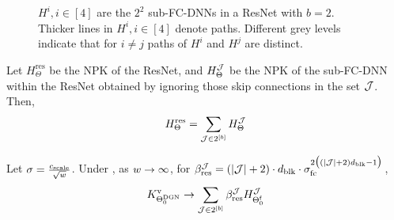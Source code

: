 \begin{figure}[h]
\caption{\small{$H^i,i\in[4]$ are the $2^2$ sub-FC-DNNs in a ResNet with $b=2$. Thicker lines in $H^i,i\in[4]$ denote paths. Different grey levels indicate that for $i\neq j$ paths of $H^i$ and $H^j$ are distinct.}}
\label{fig:subfcdnn}
\end{figure}

\begin{lemma}\label{lm:sumofproduct}
Let $H^{\text{res}}_{\Theta}$ be the NPK of the ResNet, and $H^{\mathcal{J}}_{\Theta}$ be the NPK of the sub-FC-DNN within the ResNet obtained by ignoring those skip connections in the set $\mathcal{J}$. Then, \begin{align*}H^{\text{res}}_{\Theta}=\sum_{\mathcal{J}\in 2^{[b]}}H^{\mathcal{J}}_{\Theta}\end{align*}
\end{lemma}

\begin{theorem}\label{th:mainres} Let $\sigma=\frac{c_{\text{scale}}}{\sqrt{w}}$. Under , as $w\rightarrow\infty$,  for $\beta_{\text{res}}^{\mathcal{J}} = (|\mathcal{J}| +2)\cdot d_{\text{blk}}\cdot \sigma_{\text{fc}}^{2\big( (|\mathcal{J}|+2)d_{\text{blk}}-1\big)}$,
\begin{align*}
K^{\text{v}}_{\Theta^{\text{DGN}}_0}\rightarrow \sum_{\mathcal{J}\in 2^{[b]}}  \beta_{\text{res}}^{\mathcal{J}} H^{\mathcal{J}}_{\Theta^{\textrm{f}}_0}
\end{align*}
\end{theorem}
